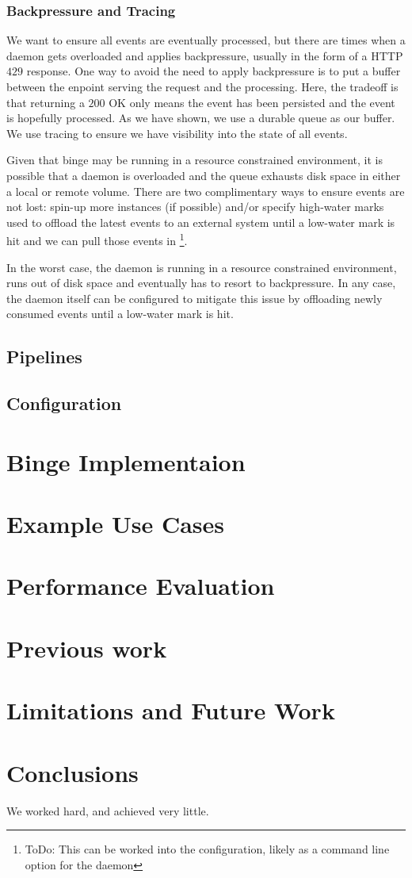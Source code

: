 \documentclass[10pt,twocolumn]{article}
\begin{document}
\subsubsection{Backpressure and Tracing}

We want to ensure all events are eventually processed, but there are times when
a daemon gets overloaded and applies backpressure, usually in the form of a
HTTP $429$ response.  One way to avoid the need to apply backpressure is to put
a buffer between the enpoint serving the request and the processing.  Here, the
tradeoff is that returning a $200$ OK only means the event has been persisted
and the event is hopefully processed.  As we have shown, we use a durable queue
as our buffer.  We use tracing to ensure we have visibility into the state of
all events.  

Given that binge may be running in a resource constrained environment, it is
possible that a daemon is overloaded and the queue exhausts disk space in
either a local or remote volume.  There are two complimentary ways to ensure
events are not lost: spin-up more instances (if possible) and/or specify
high-water marks used to offload the latest events to an external system until
a low-water mark is hit and we can pull those events in \footnote{ToDo: This
can be worked into the configuration, likely as a command line option for the
daemon}.

In the worst case, the daemon is running in a resource constrained environment,
runs out of disk space and eventually has to resort to backpressure.  In any
case, the daemon itself can be configured to mitigate this issue by offloading
newly consumed events until a low-water mark is hit.

\subsection{Pipelines}
\subsection{Configuration}

\section{Binge Implementaion}\label{binge:implementation}
\section{Example Use Cases}\label{usecases}
\section{Performance Evaluation}\label{evaluation}
\section{Previous work}\label{previous:work}
\section{Limitations and Future Work}\label{future:work}
\section{Conclusions}\label{conclusions}
We worked hard, and achieved very little.



\end{document}
